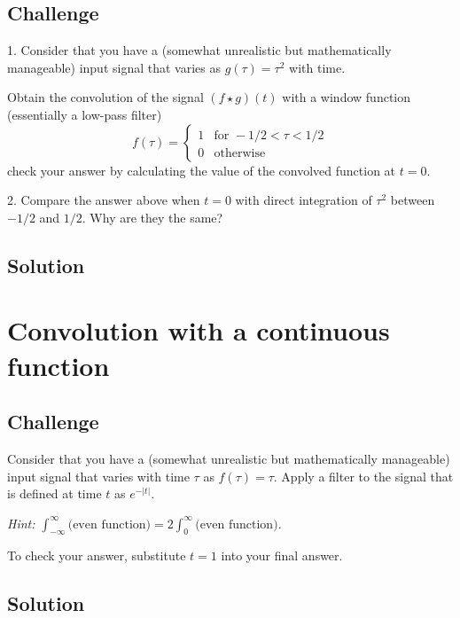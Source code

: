 \subsection*{Challenge}
1. Consider that you have a (somewhat unrealistic but mathematically manageable) input signal that varies as $g(\tau)=\tau^2$ with time. 

Obtain the convolution of the signal $(f \star g)(t)$ with a window function (essentially a low-pass filter)
\begin{equation}
    f(\tau)=
    \begin{cases}
        1 & \text{for } -1/2 < \tau < 1/2\\
        0 & \text{otherwise}
    \end{cases}
\end{equation}
check your answer by calculating the value of the convolved function at $t=0$.

2. Compare the answer above when $t=0$ with direct integration of $\tau^2$ between $-1/2$ and $1/2$. Why are they the same?

\subsection*{Solution}

\timebox




\newpage
\section{Convolution with a continuous function}

\subsection*{Challenge}
Consider that you have a (somewhat unrealistic but mathematically manageable) input signal that varies with time $\tau$ as $f(\tau)=\tau$.  Apply a filter to the signal that is defined at time $t$ as $e^{-|t|}$.

\emph{Hint: $\int_{-\infty}^{\infty} \text{(even function)} = 2 \int_{0}^{\infty} \text{(even function)}$.}

To check your answer, substitute $t=1$ into your final answer.

\subsection*{Solution}

